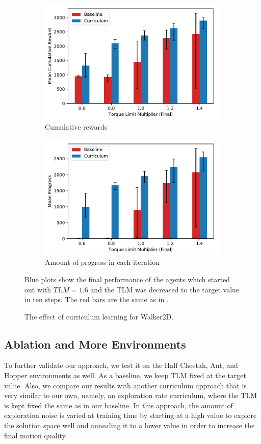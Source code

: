 \begin{figure}
    \centering
    \begin{subfigure}[t]{\textwidth}
        \centering
        \includegraphics[width=90mm]{img/TorqueLimit_Curr_Reward.pdf}
        \caption{Cumulative rewards}
    \end{subfigure}
    \begin{subfigure}[t]{\textwidth}
        \centering
        \includegraphics[width=90mm]{img/TorqueLimit_Curr_Progress.pdf}
        \caption{Amount of progress in each iteration}
        \label{fig:torque_limit_curr_b}
    \end{subfigure}
    \caption{The effect of curriculum learning for Walker2D.}{Blue plots show the final performance of the agents which started out with $TLM=1.6$ and the \ac{TLM} was decreased to the target value in ten steps. The red bars are the same as in .}
    \label{fig:torque_limit_curr}
\end{figure}


\subsection{Ablation and More Environments}

To further validate our approach, we test it on the Half Cheetah, Ant, and Hopper environments as well. As a baseline, we keep \ac{TLM} fixed at the target value.
Also, we compare our results with another curriculum approach that is very similar to our own, namely, an exploration rate curriculum, where the \ac{TLM} is kept fixed the same as in our baseline.
In this approach, the amount of exploration noise is varied at training time by starting at a high value to explore the solution space well and annealing it to a lower value in order to increase the final motion quality.

